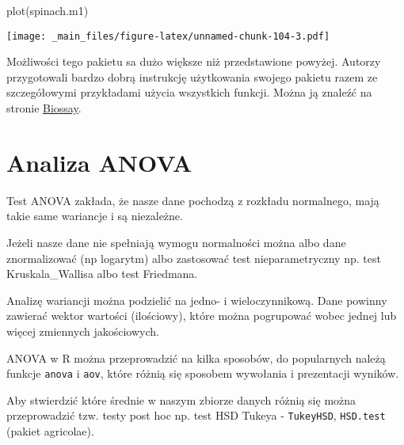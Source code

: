 \documentclass[
]{book}
\newenvironment{Shaded}{\begin{snugshade}}{\end{snugshade}}
\newcommand{\FunctionTok}[1]{\textcolor[rgb]{0.00,0.00,0.00}{#1}}
\newcommand{\NormalTok}[1]{#1}
\begin{document}
\begin{Shaded}
\begin{Highlighting}[]
\FunctionTok{plot}\NormalTok{(spinach.m1)}
\end{Highlighting}
\end{Shaded}

\texttt{[image: \_main\_files/figure-latex/unnamed-chunk-104-3.pdf]}

Możliwości tego pakietu sa dużo większe niż przedstawione powyżej. Autorzy przygotowali bardzo dobrą instrukcję użytkowania swojego pakietu razem ze szczegółowymi przykładami użycia wszystkich funkcji. Można ją znaleźć na stronie \href{http://www.bioassay.dk/}{Biossay}.

\hypertarget{analiza-anova}{%
\section{Analiza ANOVA}\label{analiza-anova}}

Test ANOVA zakłada, że nasze dane pochodzą z rozkładu normalnego, mają takie same wariancje i są niezależne.

Jeżeli nasze dane nie spełniają wymogu normalności można albo dane znormalizować (np logarytm) albo zastosować test nieparametryczny np. test Kruskala\_Wallisa albo test Friedmana.

Analizę wariancji można podzielić na jedno- i wieloczynnikową. Dane powinny zawierać wektor wartości (ilościowy), które można pogrupować wobec jednej lub więcej zmiennych jakościowych.

ANOVA w R można przeprowadzić na kilka sposobów, do popularnych należą funkcje \texttt{anova} i \texttt{aov}, które różnią się sposobem wywołania i prezentacji wyników.

Aby stwierdzić które średnie w naszym zbiorze danych różnią się można przeprowadzić tzw. testy post hoc np. test HSD Tukeya - \texttt{TukeyHSD}, \texttt{HSD.test} (pakiet agricolae).
\end{document}
